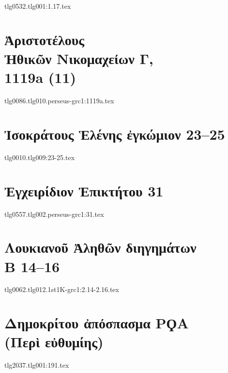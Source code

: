 \documentclass[a4paper,12pt,twoside]{report}
\begin{document}
{tlg0532.tlg001:1.17.tex}



\chapter[Ἀριστοτέλους Ἠθικῶν Νικομαχείων Γ]{\textgreek[variant=ancient]{Ἀριστοτέλους \\Ἠθικῶν Νικομαχείων Γ,} \\1119a (11)}

{tlg0086.tlg010.perseus-grc1:1119a.tex}


\chapter[Ἰσοκράτους Ἑλένης ἐγκώμιον 23]{\textgreek[variant=ancient]{Ἰσοκράτους Ἑλένης ἐγκώμιον} 23–25}

{tlg0010.tlg009:23-25.tex}


\chapter[Ἐγχειρίδιον Ἐπικτήτου 31]{\textgreek[variant=ancient]{Ἐγχειρίδιον Ἐπικτήτου} 31}

{tlg0557.tlg002.perseus-grc1:31.tex}


\chapter[Λουκιανοῦ Ἀληθῶν διηγημάτων Β]{\textgreek[variant=ancient]{Λουκιανοῦ Ἀληθῶν διηγημάτων \\Β} 14–16}

{tlg0062.tlg012.1st1K-grc1:2.14-2.16.tex}



\chapter[Δημοκρίτου ἀπόσπασμα ΡϘΑ]{\textgreek[variant=ancient]{Δημοκρίτου  ἀπόσπασμα ΡϘΑ \\(Περὶ εὐθυμίης)}}%

{tlg2037.tlg001:191.tex}


\end{document}
